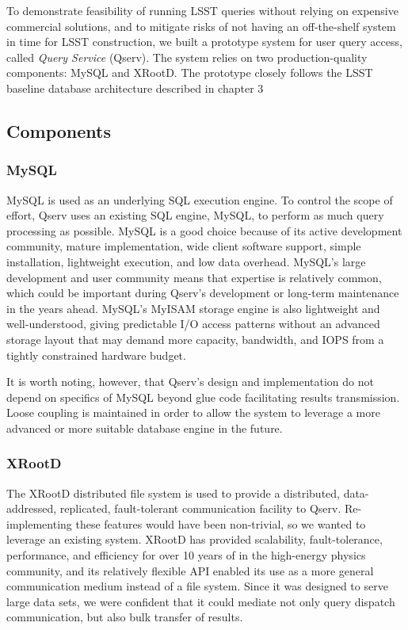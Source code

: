 \documentclass[DM,lsstdraft,toc]{lsstdoc}
\begin{document}
To demonstrate feasibility of running LSST queries without relying on
expensive commercial solutions, and to mitigate risks of not having an
off-the-shelf system in time for LSST construction, we built a prototype
system for user query access, called \emph{Query Service} (Qserv). The
system relies on two production-quality components: MySQL and
XRootD. The prototype closely follows the LSST
baseline database architecture described in chapter 3

\subsection{Components}\label{components}

\subsubsection{MySQL}\label{mysql}

MySQL is used as an underlying SQL execution engine. To control the
scope of effort, Qserv uses an existing SQL engine, MySQL, to perform as
much query processing as possible. MySQL is a good choice because of its
active development community, mature implementation, wide client
software support, simple installation, lightweight execution, and low
data overhead. MySQL's large development and user community means that
expertise is relatively common, which could be important during Qserv's
development or long-term maintenance in the years ahead. MySQL's MyISAM
storage engine is also lightweight and well-understood, giving
predictable I/O access patterns without an advanced storage layout that
may demand more capacity, bandwidth, and IOPS from a tightly constrained
hardware budget.

It is worth noting, however, that Qserv's design and implementation do
not depend on specifics of MySQL beyond glue code facilitating results
transmission. Loose coupling is maintained in order to allow the system
to leverage a more advanced or more suitable database engine in the
future.

\subsubsection{XRootD}\label{xrootd}

The XRootD distributed file system is used to
provide a distributed, data-addressed, replicated, fault-tolerant
communication facility to Qserv. Re-implementing these features would
have been non-trivial, so we wanted to leverage an existing system.
XRootD has provided scalability,
fault-tolerance, performance, and efficiency for over 10 years of in the
high-energy physics community, and its relatively flexible API enabled
its use as a more general communication medium instead of a file system.
Since it was designed to serve large data sets, we were confident that
it could mediate not only query dispatch communication, but also bulk
transfer of results.
\end{document}

